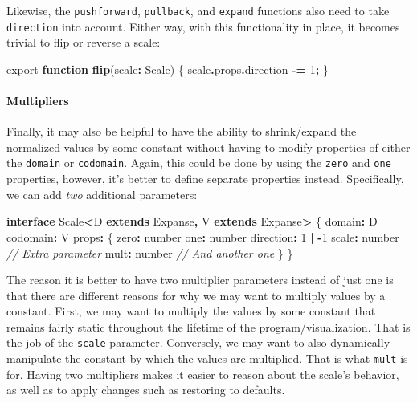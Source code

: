 \documentclass[
]{book}
\newenvironment{Shaded}{\begin{snugshade}}{\end{snugshade}}
\newcommand{\AttributeTok}[1]{\textcolor[rgb]{0.13,0.29,0.53}{#1}}
\newcommand{\CommentTok}[1]{\textcolor[rgb]{0.56,0.35,0.01}{\textit{#1}}}
\newcommand{\DataTypeTok}[1]{\textcolor[rgb]{0.13,0.29,0.53}{#1}}
\newcommand{\DecValTok}[1]{\textcolor[rgb]{0.00,0.00,0.81}{#1}}
\newcommand{\FunctionTok}[1]{\textcolor[rgb]{0.13,0.29,0.53}{\textbf{#1}}}
\newcommand{\ImportTok}[1]{#1}
\newcommand{\KeywordTok}[1]{\textcolor[rgb]{0.13,0.29,0.53}{\textbf{#1}}}
\newcommand{\NormalTok}[1]{#1}
\newcommand{\OperatorTok}[1]{\textcolor[rgb]{0.81,0.36,0.00}{\textbf{#1}}}
\theoremstyle{definition}
\theoremstyle{definition}
\theoremstyle{definition}
\theoremstyle{definition}
\theoremstyle{remark}
\begin{document}
Likewise, the \texttt{pushforward}, \texttt{pullback}, and \texttt{expand} functions also need to take \texttt{direction} into account. Either way, with this functionality in place, it becomes trivial to flip or reverse a scale:

\begin{Shaded}
\begin{Highlighting}[]
\ImportTok{export} \KeywordTok{function} \FunctionTok{flip}\NormalTok{(scale}\OperatorTok{:}\NormalTok{ Scale) \{}
\NormalTok{  scale}\OperatorTok{.}\AttributeTok{props}\OperatorTok{.}\AttributeTok{direction} \OperatorTok{{-}=} \DecValTok{1}\OperatorTok{;}
\NormalTok{\}}
\end{Highlighting}
\end{Shaded}

\paragraph{Multipliers}\label{multipliers}

Finally, it may also be helpful to have the ability to shrink/expand the normalized values by some constant without having to modify properties of either the \texttt{domain} or \texttt{codomain}. Again, this could be done by using the \texttt{zero} and \texttt{one} properties, however, it's better to define separate properties instead. Specifically, we can add \emph{two} additional parameters:

\begin{Shaded}
\begin{Highlighting}[]
\KeywordTok{interface}\NormalTok{ Scale}\OperatorTok{\textless{}}\NormalTok{D }\KeywordTok{extends}\NormalTok{ Expanse}\OperatorTok{,}\NormalTok{ V }\KeywordTok{extends}\NormalTok{ Expanse}\OperatorTok{\textgreater{}}\NormalTok{ \{}
\NormalTok{  domain}\OperatorTok{:}\NormalTok{ D}
\NormalTok{  codomain}\OperatorTok{:}\NormalTok{ V}
\NormalTok{  props}\OperatorTok{:}\NormalTok{ \{}
\NormalTok{    zero}\OperatorTok{:} \DataTypeTok{number}
\NormalTok{    one}\OperatorTok{:} \DataTypeTok{number}
\NormalTok{    direction}\OperatorTok{:} \DecValTok{1} \OperatorTok{|} \OperatorTok{{-}}\DecValTok{1}
\NormalTok{    scale}\OperatorTok{:} \DataTypeTok{number} \CommentTok{// Extra parameter}
\NormalTok{    mult}\OperatorTok{:} \DataTypeTok{number} \CommentTok{// And another one}
\NormalTok{  \}}
\NormalTok{\}}
\end{Highlighting}
\end{Shaded}

The reason it is better to have two multiplier parameters instead of just one is that there are different reasons for why we may want to multiply values by a constant. First, we may want to multiply the values by some constant that remains fairly static throughout the lifetime of the program/visualization. That is the job of the \texttt{scale} parameter. Conversely, we may want to also dynamically manipulate the constant by which the values are multiplied. That is what \texttt{mult} is for. Having two multipliers makes it easier to reason about the scale's behavior, as well as to apply changes such as restoring to defaults.
\end{document}
